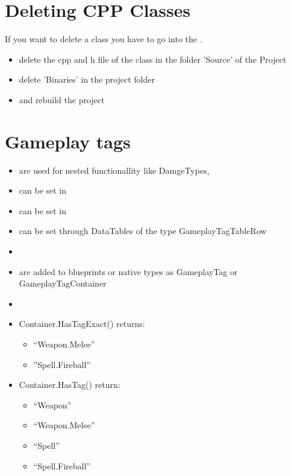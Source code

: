 \bigskip

    \section{Deleting CPP Classes}
        If you want to delete a class you have to go into the .
        \begin{itemize}
            \item delete the cpp and h file of the class in the folder 'Source' of the Project
            \item delete 'Binaries' in the project folder
            \item and rebuild the project
        \end{itemize}

    \section{Gameplay tags}
        \begin{itemize}
            \item are used for nested functionallity like DamgeTypes, 
            \item can be set in 
            \item can be set in 
            \item can be set through DataTables of the type GameplayTagTableRow
            \item 
            \item are added to blueprints or native types as GameplayTag or GameplayTagContainer
            \item 
            \item Container.HasTagExact() returns:
            \begin{itemize}
                \item “Weapon.Melee”
                \item ”Spell.Fireball” 
            \end{itemize}
            \item Container.HasTag() return:
            \begin{itemize}
                \item “Weapon”
                \item “Weapon.Melee” 
                \item “Spell” 
                \item “Spell.Fireball”
            \end{itemize} 
        \end{itemize}

